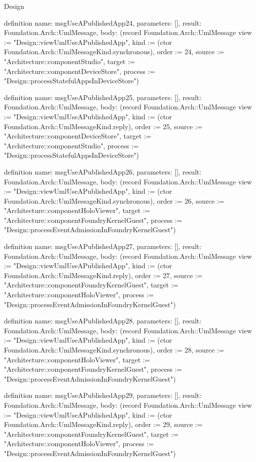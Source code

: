 \begin{lexlean}{Design}
\begin{semanticmodule}
definition{
  name: msgUseAPublishedApp24,
  parameters: [],
  result: Foundation.Arch::UmlMessage,
  body: (record Foundation.Arch::UmlMessage {view := "Design::viewUmlUseAPublishedApp", kind := (ctor Foundation.Arch::UmlMessageKind.synchronous), order := 24, source := "Architecture::componentStudio", target := "Architecture::componentDeviceStore", process := "Design::processStatefulAppsInDeviceStore"})
}

definition{
  name: msgUseAPublishedApp25,
  parameters: [],
  result: Foundation.Arch::UmlMessage,
  body: (record Foundation.Arch::UmlMessage {view := "Design::viewUmlUseAPublishedApp", kind := (ctor Foundation.Arch::UmlMessageKind.reply), order := 25, source := "Architecture::componentDeviceStore", target := "Architecture::componentStudio", process := "Design::processStatefulAppsInDeviceStore"})
}

definition{
  name: msgUseAPublishedApp26,
  parameters: [],
  result: Foundation.Arch::UmlMessage,
  body: (record Foundation.Arch::UmlMessage {view := "Design::viewUmlUseAPublishedApp", kind := (ctor Foundation.Arch::UmlMessageKind.synchronous), order := 26, source := "Architecture::componentHoloViewer", target := "Architecture::componentFoundryKernelGuest", process := "Design::processEventAdmissionInFoundryKernelGuest"})
}

definition{
  name: msgUseAPublishedApp27,
  parameters: [],
  result: Foundation.Arch::UmlMessage,
  body: (record Foundation.Arch::UmlMessage {view := "Design::viewUmlUseAPublishedApp", kind := (ctor Foundation.Arch::UmlMessageKind.reply), order := 27, source := "Architecture::componentFoundryKernelGuest", target := "Architecture::componentHoloViewer", process := "Design::processEventAdmissionInFoundryKernelGuest"})
}

definition{
  name: msgUseAPublishedApp28,
  parameters: [],
  result: Foundation.Arch::UmlMessage,
  body: (record Foundation.Arch::UmlMessage {view := "Design::viewUmlUseAPublishedApp", kind := (ctor Foundation.Arch::UmlMessageKind.synchronous), order := 28, source := "Architecture::componentHoloViewer", target := "Architecture::componentFoundryKernelGuest", process := "Design::processEventAdmissionInFoundryKernelGuest"})
}

definition{
  name: msgUseAPublishedApp29,
  parameters: [],
  result: Foundation.Arch::UmlMessage,
  body: (record Foundation.Arch::UmlMessage {view := "Design::viewUmlUseAPublishedApp", kind := (ctor Foundation.Arch::UmlMessageKind.reply), order := 29, source := "Architecture::componentFoundryKernelGuest", target := "Architecture::componentHoloViewer", process := "Design::processEventAdmissionInFoundryKernelGuest"})
}


\end{semanticmodule}
\end{lexlean}
